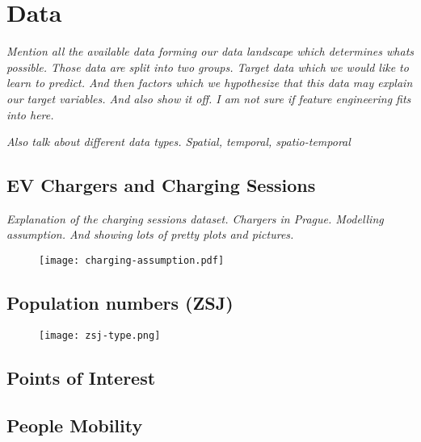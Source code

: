 \setchapterpreamble[u]{\margintoc}
\chapter{Data}
\label{ch:data}




\textit{
    Mention all the available data forming our data landscape which determines whats possible. Those data are split into two groups. Target data which we would like to learn to predict. And then factors which we hypothesize that this data may explain our target variables.
    And also show it off. I am not sure if feature engineering fits into here.
}

\textit{Also talk about different data types. Spatial, temporal, spatio-temporal}


\section{EV Chargers and Charging Sessions}


\textit{Explanation of the charging sessions dataset. Chargers in Prague. Modelling assumption. And showing lots of pretty plots and pictures.}

\begin{figure}[hb]
    \texttt{[image: charging-assumption.pdf]}
\end{figure}

\section{Population numbers (ZSJ)}

\begin{figure}[hb]
    \texttt{[image: zsj-type.png]}
\end{figure}

\section{Points of Interest}


\section{People Mobility}

